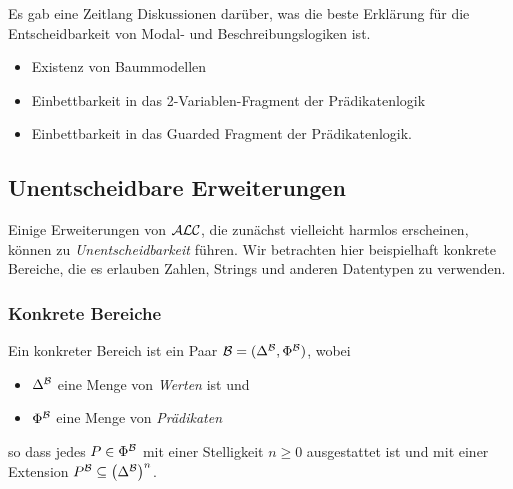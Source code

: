 Es gab eine Zeitlang Diskussionen darüber, was die beste Erklärung für die Entscheidbarkeit von Modal- und Beschreibungslogiken ist.
\begin{itemize}
    \item Existenz von Baummodellen
    \item Einbettbarkeit in das 2-Variablen-Fragment der Prädikatenlogik
    \item Einbettbarkeit in das Guarded Fragment der Prädikatenlogik.
\end{itemize}

\subsection{Unentscheidbare Erweiterungen}\label{unentscheidbare-erweiterungen}

Einige Erweiterungen von $\mathcal{A}\mathcal{L}\mathcal{C}$, die zunächst vielleicht harmlos erscheinen, können zu \emph{Unentscheidbarkeit} führen. Wir betrachten hier beispielhaft konkrete Bereiche, die es erlauben Zahlen, Strings und anderen Datentypen zu verwenden.

\subsubsection{Konkrete Bereiche}

\begin{definition}
    Ein konkreter Bereich ist ein Paar $\mathcal{B} = (\Delta^{\mathcal{B}}, \Phi^{\mathcal{B}})$, wobei
\begin{itemize}
    \item $\Delta^{\mathcal{B}}$ eine Menge von \emph{Werten} ist und
    \item $\Phi^{\mathcal{B}}$ eine Menge von \emph{Prädikaten}
\end{itemize}
so dass jedes $P \in \Phi^{\mathcal{B}}$ mit einer Stelligkeit $n \geq 0$
ausgestattet ist und mit einer Extension
$P^\MB \subseteq {\left( \Delta^\MB \right)}^n$.
\end{definition}

